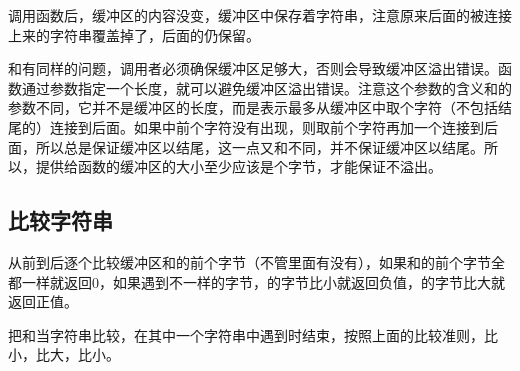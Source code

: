 

调用函数后，缓冲区的内容没变，缓冲区中保存着字符串，注意原来后面的被连接上来的字符串覆盖掉了，后面的仍保留。



和有同样的问题，调用者必须确保缓冲区足够大，否则会导致缓冲区溢出错误。函数通过参数指定一个长度，就可以避免缓冲区溢出错误。注意这个参数的含义和的参数不同，它并不是缓冲区的长度，而是表示最多从缓冲区中取个字符（不包括结尾的）连接到后面。如果中前个字符没有出现，则取前个字符再加一个连接到后面，所以总是保证缓冲区以结尾，这一点又和不同，并不保证缓冲区以结尾。所以，提供给函数的缓冲区的大小至少应该是个字节，才能保证不溢出。


\subsection{比较字符串}
%



从前到后逐个比较缓冲区和的前个字节（不管里面有没有），如果和的前个字节全都一样就返回0，如果遇到不一样的字节，的字节比小就返回负值，的字节比大就返回正值。



把和当字符串比较，在其中一个字符串中遇到时结束，按照上面的比较准则，比小，比大，比小。



